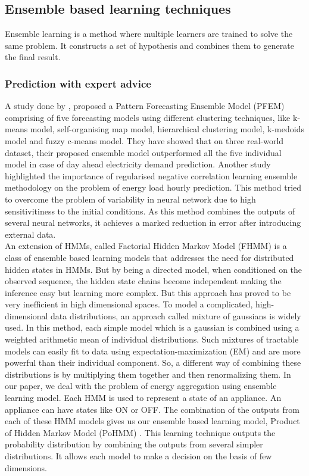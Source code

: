 \documentclass{sig-alternate}
\begin{document}
\subsection{Ensemble based learning techniques}
Ensemble learning is a method where multiple learners are trained to solve the same problem. It constructs a set of hypothesis and combines them to generate the final result.
\subsubsection{Prediction with expert advice}
A study done by \cite{Shen}, proposed a Pattern Forecasting Ensemble Model (PFEM) comprising of five forecasting models using different clustering techniques, like k-means model, self-organising map model, hierarchical clustering model, k-medoids model and fuzzy c-means model. They have showed that on three real-world dataset, their proposed ensemble model outperformed all the five individual model in case of day ahead electricity demand prediction.
Another study \cite{Felice} highlighted the importance of regularised negative correlation learning ensemble methodology on the problem of energy load hourly prediction. This method tried to overcome the problem of variability in neural network due to high sensitivitiness to the initial conditions. As this method combines the outputs of several neural networks, it achieves a marked reduction in error after introducing external data. \\
An extension of HMMs, called Factorial Hidden Markov Model (FHMM) \cite{fhmm} is a class of ensemble based learning models that addresses the need for distributed hidden states in HMMs. But by being a directed model, when conditioned on the observed sequence, the hidden state chains become independent making the inference easy but learning more complex. But this approach has proved to be very inefficient in high dimensional spaces.
To model a complicated, high-dimensional data distributions, an approach called mixture of gaussians is widely used. In this method, each simple model which is a gaussian is combined using a weighted arithmetic mean of individual distributions. Such mixtures of tractable models can easily fit to data using expectation-maximization (EM) and are more powerful than their individual component. So, a different way of combining these distributions is by multiplying them together and then renormalizing them.
In our paper,  we deal with the problem of energy aggregation using ensemble learning model. Each HMM is used to represent a state of an appliance. An appliance can have states like ON or OFF. The combination of the outputs from each of these HMM models gives us our ensemble based learning model, Product of Hidden Markov Model (PoHMM) \cite{hinton2000}. This learning technique outputs the probability distribution by combining the outputs from several simpler distributions. It allows each model to make a decision on the basis of few dimensions.
\end{document}
